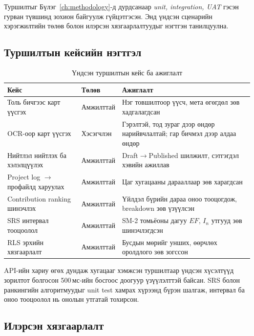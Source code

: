 Туршилтыг Бүлэг~\ref{ch:methodology}-д дурдсанаар \textit{unit, integration, UAT} гэсэн гурван түвшинд зохион байгуулж гүйцэтгэсэн. Энд үндсэн сценарийн хэрэгжилтийн төлөв болон илэрсэн хязгаарлалтуудыг нэгтгэн танилцуулна.

\subsection{Туршилтын кейсийн нэгтгэл}

\par
\begin{table}[H]
\centering
\caption{Үндсэн туршилтын кейс ба ажиглалт}
\label{tab:test-cases}
\begin{tabular}{|p{4.5cm}|p{2.5cm}|p{6cm}|}
\hline
\textbf{Кейс} & \textbf{Төлөв} & \textbf{Ажиглалт} \\ \hline
Толь бичгээс карт үүсгэх        & Амжилттай & Нэг товшилтоор үүсч, мета өгөгдөл зөв хадгалагдсан \\ \hline
OCR-оор карт үүсгэх             & Хэсэгчлэн & Гэрэлтэй, тод зураг дээр өндөр нарийвчлалтай; гар бичмэл дээр алдаа өндөр \\ \hline
Нийтлэл нийтлэх ба хэлэлцүүлэх & Амжилттай & Draft$\rightarrow$Published шилжилт, сэтгэгдэл хэвийн ажиллав \\ \hline
Project log $\rightarrow$ профайлд харуулах & Амжилттай & Цаг хугацааны дарааллаар зөв харагдсан \\ \hline
Contribution ranking шинэчлэх   & Амжилттай & Үйлдэл бүрийн дараа оноо тооцогдож, breakdown зөв үзүүлсэн \\ \hline
SRS интервал тооцоолол          & Амжилттай & SM-2 томьёоны дагуу $EF$, $I_n$ утгууд зөв шинэчлэгдсэн \\ \hline
RLS эрхийн хязгаарлалт          & Амжилттай & Бусдын мөрийг унших, өөрчлөх оролдлого зөв зогссон \\ \hline
\end{tabular}
\end{table}

API-ийн хариу өгөх дундаж хугацааг хэмжсэн туршилтаар үндсэн хүсэлтүүд зорилтот болгосон 500\,мс-ийн босгоос доогуур үзүүлэлттэй байсан. SRS болон ранкингийн алгоритмуудыг unit test хамрах хүрээнд бүрэн шалгаж, интервал ба оноо тооцоолол нь онолын утгатай тохирсон.

\subsection{Илэрсэн хязгаарлалт}

